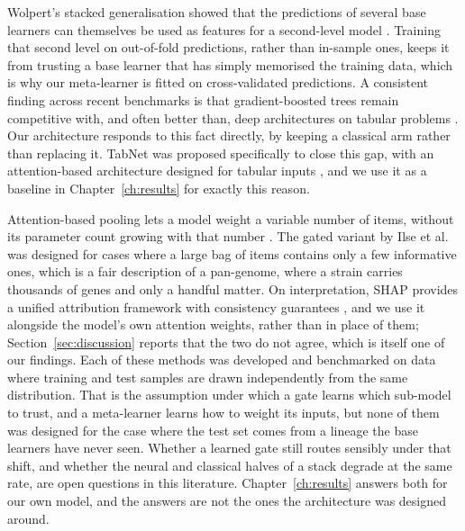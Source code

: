 \vspace{1em}

Wolpert's stacked generalisation showed that the predictions of several base learners can themselves be used as features for a second-level model \cite{wolpert1992stacked}. Training that second level on out-of-fold predictions, rather than in-sample ones, keeps it from trusting a base learner that has simply memorised the training data, which is why our meta-learner is fitted on cross-validated predictions. A consistent finding across recent benchmarks is that gradient-boosted trees remain competitive with, and often better than, deep architectures on tabular problems \cite{grinsztajn2022trees, shwartzziv2022tabular}. Our architecture responds to this fact directly, by keeping a classical arm rather than replacing it. TabNet was proposed specifically to close this gap, with an attention-based architecture designed for tabular inputs \cite{arik2021tabnet}, and we use it as a baseline in Chapter~\ref{ch:results} for exactly this reason.

\vspace{1em}

Attention-based pooling lets a model weight a variable number of items, without its parameter count growing with that number \cite{vaswani2017attention}. The gated variant by Ilse et al.\ \cite{ilse2018attention} was designed for cases where a large bag of items contains only a few informative ones, which is a fair description of a pan-genome, where a strain carries thousands of genes and only a handful matter. On interpretation, SHAP provides a unified attribution framework with consistency guarantees \cite{lundberg2017shap}, and we use it alongside the model's own attention weights, rather than in place of them; Section~\ref{sec:discussion} reports that the two do not agree, which is itself one of our findings. Each of these methods was developed and benchmarked on data where training and test samples are drawn independently from the same distribution. That is the assumption under which a gate learns which sub-model to trust, and a meta-learner learns how to weight its inputs, but none of them was designed for the case where the test set comes from a lineage the base learners have never seen. Whether a learned gate still routes sensibly under that shift, and whether the neural and classical halves of a stack degrade at the same rate, are open questions in this literature. Chapter~\ref{ch:results} answers both for our own model, and the answers are not the ones the architecture was designed around.

